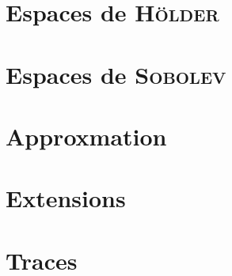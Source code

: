 \documentclass[../distribution.tex]{subfiles}
\begin{document}
	\localtableofcontents

	\section{Espaces de \textsc{Hölder}}{
		
	}

	\section{Espaces de \textsc{Sobolev}}{
		
	}

	\section{Approxmation}{
		
	}

	\section{Extensions}{
		
	}

	\section{Traces}{
		
	}
\end{document}
